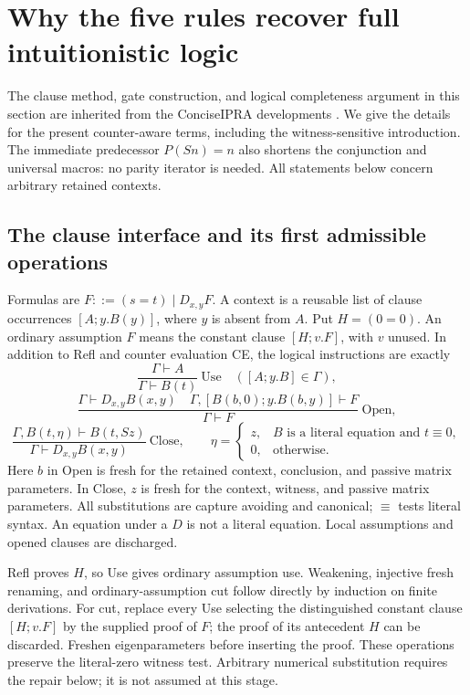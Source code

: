 \section{Why the five rules recover full intuitionistic logic}
\label{sec:counter-logic}

The clause method, gate construction, and logical completeness argument in
this section are inherited from the ConciseIPRA developments \cite{basis,counter,single}. We give
the details for the present counter-aware terms, including the
witness-sensitive introduction. The immediate predecessor $P(Sn)=n$
also shortens the conjunction and universal macros: no parity iterator is
needed. All statements below concern arbitrary retained contexts.

\subsection{The clause interface and its first admissible operations}

Formulas are $F::=(s=t)\mid D_{x,y}F$. A context is a reusable list of
clause occurrences $[A;y.B(y)]$, where $y$ is absent from $A$. Put
$H=(0=0)$. An ordinary assumption $F$ means the constant clause
$[H;v.F]$, with $v$ unused. In addition to Refl and counter evaluation
CE, the logical instructions are exactly
\[
 \frac{\Gamma\vdash A}{\Gamma\vdash B(t)}\ \mathrm{Use}
 \quad([A;y.B]\in\Gamma),
\]
\[
 \frac{\Gamma\vdash D_{x,y}B(x,y)\quad
       \Gamma,[B(b,0);y.B(b,y)]\vdash F}
      {\Gamma\vdash F}\ \mathrm{Open},
\]
\[
 \frac{\Gamma,B(t,\eta)\vdash B(t,Sz)}
      {\Gamma\vdash D_{x,y}B(x,y)}\ \mathrm{Close},
 \qquad
 \eta=\begin{cases}
 z,& B\text{ is a literal equation and }t\equiv0,\\
 0,&\text{otherwise}.
 \end{cases}
\]
Here $b$ in Open is fresh for the retained context, conclusion, and passive
matrix parameters. In Close, $z$ is fresh for the context, witness, and
passive matrix parameters. All substitutions are capture avoiding and
canonical; $\equiv$ tests literal syntax. An equation under a $D$ is not
a literal equation. Local assumptions and opened clauses are discharged.

Refl proves $H$, so Use gives ordinary assumption use. Weakening,
injective fresh renaming, and ordinary-assumption cut follow directly by
induction on finite derivations. For cut, replace every Use selecting the
distinguished constant clause $[H;v.F]$ by the supplied proof of $F$;
the proof of its antecedent $H$ can be discarded. Freshen eigenparameters
before inserting the proof. These operations preserve the literal-zero
witness test. Arbitrary numerical substitution requires the repair below;
it is not assumed at this stage.

